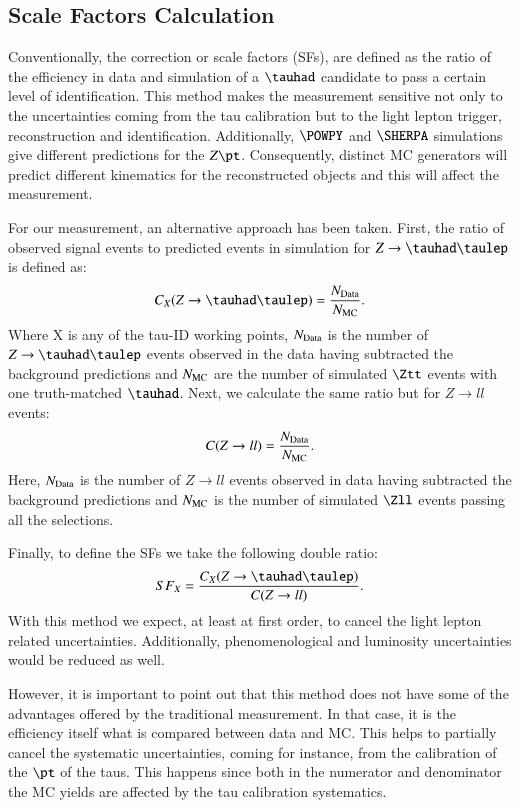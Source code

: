 \subsection{Scale Factors Calculation}\label{sec3.2}
Conventionally, the correction or scale factors (SFs), are defined as the ratio of the efficiency in data and simulation of a $\tauhad$ candidate to pass a certain level of identification. This method makes the measurement sensitive not only to the uncertainties coming from the tau calibration but to the light lepton trigger, reconstruction and identification. Additionally, $\POWPY$ and $\SHERPA$ simulations give different predictions for the $Z\pt$. Consequently, distinct MC generators will predict different kinematics for the reconstructed objects and this will affect the measurement.

For our measurement, an alternative approach has been taken. First, the ratio of observed signal events to predicted events in simulation for $Z\to\tauhad\taulep$ is defined as:
\begin{equation}
	C_{X}(Z\to\tauhad\taulep)=\frac{\NData}{\NMC}.
	\label{eq14}
\end{equation}
Where X is any of the tau-ID working points, $N_{\text{Data}}$ is the number of $Z\to\tauhad\taulep$ events observed in the data having subtracted the background predictions and $N_{\text{MC}}$ are the number of simulated $\Ztt$ events with one truth-matched $\tauhad$. Next, we calculate the same ratio but for $Z\to ll$ events:
\begin{equation}
C(Z\to ll)=\frac{N_{\text{Data}}}{N_{\text{MC}}}.
\end{equation}
Here, $N_{\text{Data}}$ is the number of $Z\to ll$ events observed in data having subtracted the background predictions and $N_{\text{MC}}$ is the number of simulated $\Zll$ events passing all the selections.

Finally, to define the SFs we take the following double ratio:
\begin{equation}
SF_{X}=\frac{C_{X}(Z\to\tauhad\taulep)}{C(Z\to ll)}.
\end{equation}
With this method we expect, at least at first order, to cancel the light lepton related uncertainties. Additionally, phenomenological and luminosity uncertainties would be reduced as well.

However, it is important to point out that this method does not have some of the advantages offered by the traditional measurement. In that case, it is the efficiency itself what is compared between data and MC. This helps to partially cancel the systematic uncertainties, coming for instance, from the calibration of the $\pt$ of the taus. This happens since both in the numerator and denominator the MC yields are affected by the tau calibration systematics.
  

